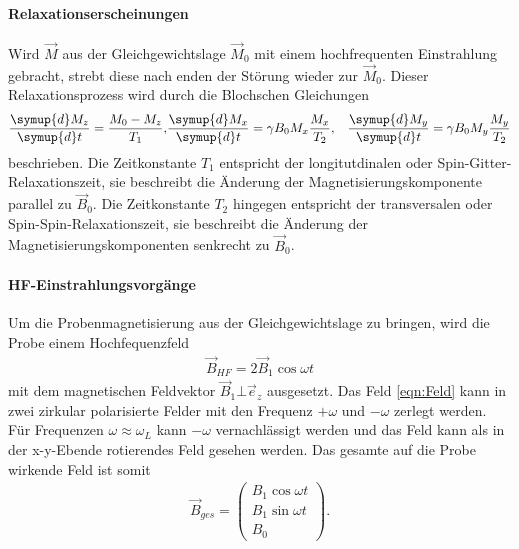 \paragraph{Relaxationserscheinungen}
Wird $\vec{M}$ aus der Gleichgewichtslage $\vec{M}_0$
mit einem hochfrequenten Einstrahlung gebracht, strebt diese
nach enden der Störung wieder zur $\vec{M}_0$.
Dieser Relaxationsprozess wird durch die
Blochschen Gleichungen
\begin{align}
  \frac{\symup{d}M_z}{\symup{d}t}=\frac{M_0-M_z}{T_1},
  &\frac{\symup{d}M_x}{\symup{d}t}=\gamma B_0 M_x\frac{M_x}{T_2},
  &\frac{\symup{d}M_y}{\symup{d}t}=\gamma B_0 M_y\frac{M_y}{T_2} \label{eqn:bloch}
\end{align}
beschrieben.
Die Zeitkonstante $T_1$ entspricht
der longitutdinalen oder Spin-Gitter-Relaxationszeit, sie
beschreibt die Änderung der Magnetisierungskomponente parallel zu
$\vec{B}_0$. Die Zeitkonstante $T_2$ hingegen entspricht
der transversalen oder Spin-Spin-Relaxationszeit, sie
beschreibt die Änderung der Magnetisierungskomponenten
senkrecht zu $\vec{B}_0$.

\paragraph{HF-Einstrahlungsvorgänge}
\label{para:HF}
Um die Probenmagnetisierung aus der Gleichgewichtslage
zu bringen, wird die Probe einem Hochfequenzfeld
\begin{align}
   \vec{B}_{HF}=2\vec{B}_1 \cos\omega t \label{eqn:Feld}
\end{align}
mit dem magnetischen
Feldvektor $\vec{B}_1 \bot \vec{e}_z$ ausgesetzt.
Das Feld \eqref{eqn:Feld} kann in
zwei zirkular polarisierte Felder mit den Frequenz
$+\omega$ und $-\omega$ zerlegt werden.
Für Frequenzen $\omega\approx\omega_L$
kann $-\omega$ vernachlässigt werden und
das Feld kann als in der x-y-Ebende rotierendes Feld
gesehen werden. Das gesamte auf die Probe
wirkende Feld ist somit
\begin{align}
\vec{B}_{ges}=  \left( \begin{array}{c} B_1 \cos \omega t \\ B_1 \sin \omega t \\ B_0 \end{array}\right).
\end{align}

